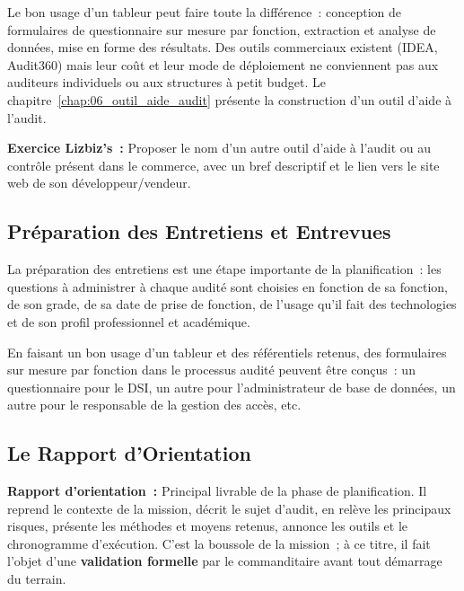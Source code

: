 Le bon usage d'un tableur peut faire toute la différence~: conception de formulaires
de questionnaire sur mesure par fonction, extraction et analyse de données, mise en
forme des résultats. Des outils commerciaux existent (IDEA, Audit360) mais leur coût
et leur mode de déploiement ne conviennent pas aux auditeurs individuels ou aux
structures à petit budget. Le chapitre~\ref{chap:06_outil_aide_audit} présente la construction d'un outil d'aide à l'audit.

\begin{boxlizbiz}
\textbf{Exercice Lizbiz's~:}
Proposer le nom d'un autre outil d'aide à l'audit ou au contrôle présent dans le
commerce, avec un bref descriptif et le lien vers le site web de son
développeur/vendeur.
\end{boxlizbiz}

\subsection{Préparation des Entretiens et Entrevues}
\label{subsec:prep-entretiens}

La préparation des entretiens est une étape importante de la planification~: les
questions à administrer à chaque audité sont choisies en fonction de sa fonction,
de son grade, de sa date de prise de fonction, de l'usage qu'il fait des technologies
et de son profil professionnel et académique.

En faisant un bon usage d'un tableur et des référentiels retenus, des formulaires
sur mesure par fonction dans le processus audité peuvent être conçus~: un questionnaire
pour le DSI, un autre pour l'administrateur de base de données, un autre pour le
responsable de la gestion des accès, etc.

\subsection{Le Rapport d'Orientation}
\label{subsec:rapport-orientation}

\begin{boxdef}
\textbf{Rapport d'orientation~:} Principal livrable de la phase de planification.
Il reprend le contexte de la mission, décrit le sujet d'audit, en relève les
principaux risques, présente les méthodes et moyens retenus, annonce les outils
et le chronogramme d'exécution. C'est la boussole de la mission~; à ce titre,
il fait l'objet d'une \textbf{validation formelle} par le commanditaire avant
tout démarrage du terrain.
\end{boxdef}

